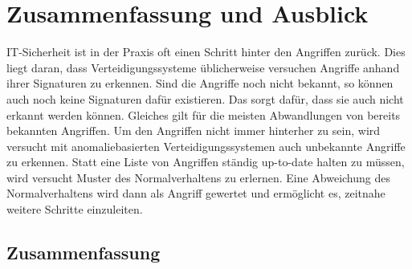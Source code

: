 \chapter{Zusammenfassung und Ausblick}\label{ch:schluss}

IT-Sicherheit ist in der Praxis oft einen Schritt hinter den Angriffen zurück.
Dies liegt daran, dass Verteidigungssysteme üblicherweise versuchen Angriffe anhand ihrer Signaturen zu erkennen.
Sind die Angriffe noch nicht bekannt, so können auch noch keine Signaturen dafür existieren.
Das sorgt dafür, dass sie auch nicht erkannt werden können.
Gleiches gilt für die meisten Abwandlungen von bereits bekannten Angriffen.
Um den Angriffen nicht immer hinterher zu sein, wird versucht mit anomaliebasierten Verteidigungssystemen auch unbekannte Angriffe zu erkennen.
Statt eine Liste von Angriffen ständig up-to-date halten zu müssen, wird versucht Muster des Normalverhaltens zu erlernen.
Eine Abweichung des Normalverhaltens wird dann als Angriff gewertet und ermöglicht es, zeitnahe weitere Schritte einzuleiten.

\section{Zusammenfassung}


